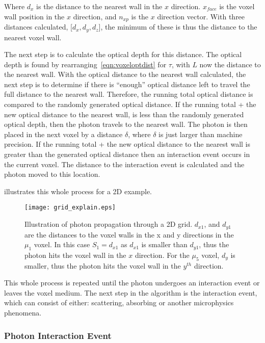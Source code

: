Where $d_x$ is the distance to the nearest wall in the $x$ direction. $x_{face}$ is the voxel wall position in the $x$ direction, and $n_{xp}$ is the $x$ direction vector.
With three distances calculated, [$d_x, d_y, d_z$], the minimum of these is thus the distance to the nearest voxel wall.

The next step is to calculate the optical depth for this distance.
The optical depth is found by rearranging~\cref{eqn:voxeloptdist} for $\tau$, with $L$ now the distance to the nearest wall.
With the optical distance to the nearest wall calculated, the next step is to determine if there is ``enough'' optical distance left to travel the full distance to the nearest wall.
Therefore, the running total optical distance is compared to the randomly generated optical distance.
If the running total + the new optical distance to the nearest wall, is less than the randomly generated optical depth, then the photon travels to the nearest wall.
The photon is then placed in the next voxel by a distance $\delta$, where $\delta$ is just larger than machine precision.
If the running total + the new optical distance to the nearest wall is greater than the generated optical distance then an interaction event occurs in the current voxel.
The distance to the interaction event is calculated and the photon moved to this location. 

 illustrates this whole process for a 2D example.

\begin{figure}[!ht]
	\centering
	\texttt{[image: grid\_explain.eps]}
	\caption{Illustration of photon propagation through a 2D grid. $d_{x1}$, and $d_{y1}$ are the distances to the voxel walls in the x and y directions in the $\mu_1$ voxel. In this case $S_1=d_{x1}$ as $d_{x1}$ is smaller than $d_{y1}$, thus the photon hits the voxel wall in the $x$ direction. For the $\mu_5$ voxel, $d_y$ is smaller, thus the photon hits the voxel wall in the $y^{th}$ direction.}
	\label{fig:voxelpropexplain}
\end{figure}

This whole process is repeated until the photon undergoes an interaction event or leaves the voxel medium.
The next step in the algorithm is the interaction event, which can consist of either: scattering, absorbing or another microphysics phenomena. 

\subsubsection*{Photon Interaction Event}\label{sec:photscatterabsorb}

